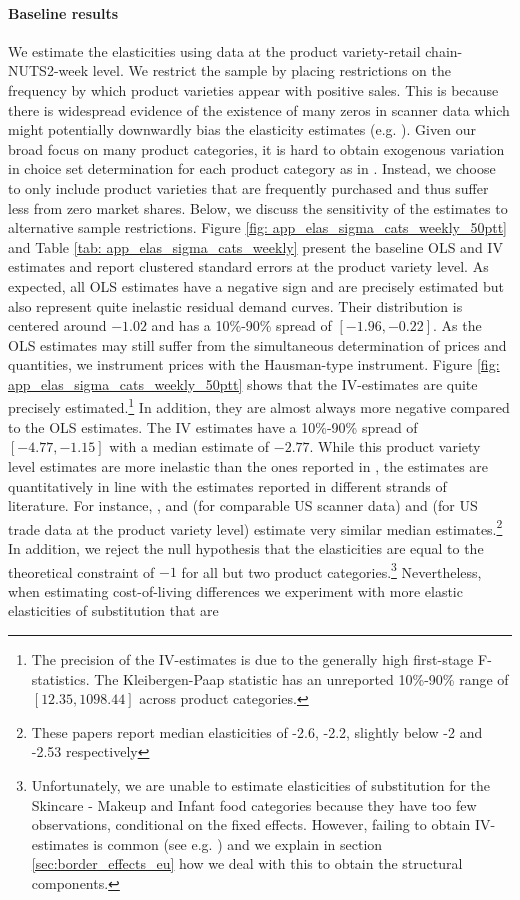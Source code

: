\paragraph{Baseline results}    We estimate the elasticities using data at the product variety-retail chain-NUTS2-week level. We restrict the sample by placing restrictions on the frequency by which product varieties appear with positive sales. This is because there is widespread evidence of the existence of many zeros in scanner data which might potentially downwardly bias the elasticity estimates (e.g. \citet{Dube2021, Gandhi2022}). Given our broad focus on many product categories, it is hard to obtain exogenous variation in choice set determination for each product category as in \citet{Dube2021}. Instead, we choose to only include product varieties that are frequently purchased and thus suffer less from zero market shares. Below, we discuss the sensitivity of the estimates to alternative sample restrictions. Figure \ref{fig: app_elas_sigma_cats_weekly_50ptt} and Table \ref{tab: app_elas_sigma_cats_weekly} present the baseline OLS and IV estimates and report clustered standard errors at the product variety level. As expected, all OLS estimates have a negative sign and are precisely estimated but also represent quite inelastic residual demand curves. Their distribution is centered around $-1.02$ and has a 10\%-90\% spread of $[-1.96,-0.22]$. As the OLS estimates may still suffer from the simultaneous determination of prices and quantities, we instrument prices with the Hausman-type instrument. Figure \ref{fig: app_elas_sigma_cats_weekly_50ptt} shows that the IV-estimates are quite precisely estimated.\footnote{The precision of the IV-estimates is due to the generally high first-stage F-statistics. The Kleibergen-Paap statistic has an unreported 10\%-90\% range of $[12.35, 1098.44]$ across product categories.} In addition, they are almost always more negative compared to the OLS estimates. The IV estimates have a 10\%-90\% spread of $[-4.77,-1.15]$ with a median estimate of $-2.77$. While this product variety level estimates are more inelastic than the ones reported in \citet{Hottman2016}, the estimates are quantitatively in line with the estimates reported in different strands of literature. For instance, \citet{Dellavigna2019}, \citet{Faber2021} and \citet{Dopper2022} (for comparable US scanner data) and \citet{Fajgelbaum2020} (for US trade data at the product variety level) estimate very similar median estimates.\footnote{These papers report median elasticities of -2.6, -2.2, slightly below -2 and -2.53 respectively} In addition, we reject the null hypothesis that the elasticities are equal to the theoretical constraint of $-1$ for all but two product categories.\footnote{Unfortunately, we are unable to estimate elasticities of substitution for the Skincare - Makeup and Infant food categories because they have too few observations, conditional on the fixed effects. However, failing to obtain IV-estimates is common (see e.g. \citet{Hottman2016, Jaravel2019}) and we explain in section \ref{sec:border_effects_eu} how we deal with this to obtain the structural components.} Nevertheless, when estimating cost-of-living differences we experiment with more elastic elasticities of substitution that are 